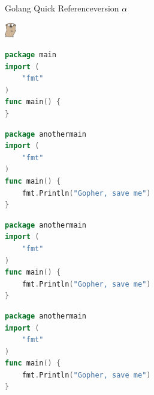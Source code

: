 \documentclass{article}
\begin{document}
\noindent
\begin{minipage}{.5\textwidth}
\Large{Golang Quick Reference}\tiny{version $\alpha$}
\end{minipage}%
\begin{minipage}{.5\textwidth}
\begin{adjustbox}{right}
\includegraphics[width=0.5cm]{./figures/gopher.eps}%
\end{adjustbox}%
\end{minipage}%
\tiny%
\begin{pagebox}
\setlength\multicolsep{0pt}%
\setlength\columnsep{5pt}%
\begin{multicols}{4}
\begin{codebox}
\begin{lstlisting}[language=go]
package main
import (
	"fmt"
)
func main() {
}
\end{lstlisting}
\end{codebox}

\begin{codebox}
\begin{lstlisting}[language=go]
package anothermain
import (
	"fmt"
)
func main() {
	fmt.Println("Gopher, save me")
}
\end{lstlisting}
\end{codebox}
\columnbreak
\begin{codebox}
\begin{lstlisting}[language=go]
package anothermain
import (
	"fmt"
)
func main() {
	fmt.Println("Gopher, save me")
}
\end{lstlisting}
\end{codebox}
\columnbreak
\begin{codebox}
\begin{lstlisting}[language=go]
package anothermain
import (
	"fmt"
)
func main() {
	fmt.Println("Gopher, save me")
}
\end{lstlisting}
\end{codebox}
\end{multicols}
\end{pagebox}
\end{document}
